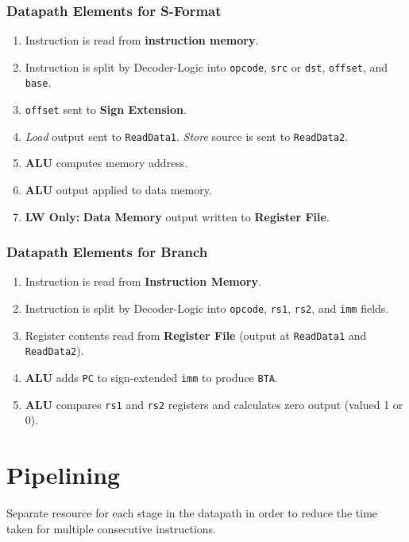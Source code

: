 \documentclass[12pt, letterpaper]{article}
\begin{document}
\section*{Datapath Elements for S-Format}

\begin{enumerate}
  \item Instruction is read from \textbf{instruction memory}.
  \item Instruction is split by Decoder-Logic into \texttt{opcode},
    \texttt{src} or \texttt{dst}, \texttt{offset}, and \texttt{base}.
  \item \texttt{offset} sent to \textbf{Sign Extension}.
  \item \textit{Load} output sent to \texttt{ReadData1}.
    \textit{Store} source is sent to \texttt{ReadData2}.
  \item \textbf{ALU} computes memory address.
  \item \textbf{ALU} output applied to data memory.
  \item \textbf{LW Only:} \textbf{Data Memory} output written to
    \textbf{Register File}.
\end{enumerate}

\section*{Datapath Elements for Branch}

\begin{enumerate}
  \item Instruction is read from \textbf{Instruction Memory}.
  \item Instruction is split by Decoder-Logic into \texttt{opcode},
    \texttt{rs1}, \texttt{rs2}, and \texttt{imm} fields.
  \item Register contents read from \textbf{Register File} (output at
    \texttt{ReadData1} and \texttt{ReadData2}).
  \item \textbf{ALU} adds \texttt{PC} to sign-extended \texttt{imm}
    to produce \texttt{BTA}.
  \item \textbf{ALU} compares \texttt{rs1} and \texttt{rs2} registers
    and calculates zero output (valued 1 or 0).
\end{enumerate}

\part*{Pipelining}

Separate resource for each stage in the datapath in order to reduce
the time taken for multiple consecutive instructions.
\end{document}
